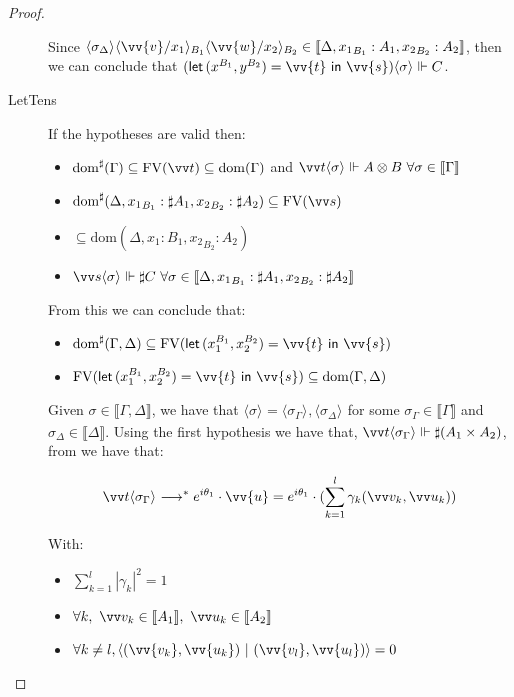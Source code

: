 \documentclass[runningheads,orivec,envcountsame,envcountsect]{llncs}
\newcommand\lra{\longrightarrow}
\newcommand\ansubst[2]{\ensuremath{\langle #1 \rangle_{#2}}}
\newcommand\dom[1]{\mathrm{dom}(#1)}
\newcommand\sdom[1]{\mathrm{dom}^{\sharp}(#1)}
\newcommand\FV[1]{\mathrm{FV}(#1)}
\def\scal#1#2{\langle{#1}~|~{#2}\rangle}
\def\Pair#1#2{(#1,#2)} %
\def\letkeyword{\mathsf{let}}
\def\inkeyword{\mathsf{in}}
\def\LetP#1#2#3#4#5#6{\letkeyword\,\Pair{#1^{#2}}{#3^{#4}}=#5~\inkeyword~#6}
\def\eval{\lra^*}
\def\sem#1{\llbracket#1\rrbracket}
\def\real{\Vdash}
\begin{document}
\begin{proof}
\begin{description}
    Since $\ansubst{\sigma_\Delta}{}\ansubst{\vv{v}/x_1}{B_1}\ansubst{\vv{w}/x_2}{B_2}\in\sem{\Delta,{x_1}_{B_1}:A_1,{x_2}_{B_2}:A_2}$, then we can conclude that $(\LetP{x}{B_1}{y}{B_2}{\vv{t}}{\vv{s}})\ansubst{\sigma}{}\real C$.

    \item[LetTens] If the hypotheses are valid then:
    \begin{itemize}
        \item $\sdom{\Gamma}\subseteq \FV{\vv t} \subseteq \dom{\Gamma}$ and $\vv t \ansubst{\sigma}{}\Vdash A\otimes B\ \forall \sigma\in\sem\Gamma$
        \item $\sdom{\Delta, {x_1}_{B_1}:\sharp A_1, {x_2}_{B_2}:\sharp A_2}\subseteq \FV{\vv s}$
        \item $\subseteq \dom{\Delta,{x_1}:{B_1}, {x_2}_{B_2}:A_2}$
        \item $\vv s \ansubst{\sigma}{}\Vdash \sharp C\ \forall \sigma\in\sem{\Delta, {x_1}_{B_1}:\sharp A_1, {x_2}_{B_2}:\sharp A_2}$
    \end{itemize}
    
    From this we can conclude that:
    \begin{itemize}
        \item $\sdom{\Gamma,\Delta}\subseteq\FV{\LetP{x_1}{B_1}{x_2}{B_2}{\vv{t}}{\vv{s}}}$
        \item $\FV{\LetP{x_1}{B_1}{x_2}{B_2}{\vv{t}}{\vv{s}}}\subseteq\dom{\Gamma,\Delta}$
    \end{itemize}
    
    Given $\sigma\in\sem{\Gamma,\Delta}$, we have that $\ansubst{\sigma}{}=\ansubst{\sigma_\Gamma}{},\ansubst{\sigma_\Delta}{}$ for some $\sigma_\Gamma\in\sem\Gamma$ and $\sigma_\Delta\in\sem\Delta$. Using the first hypothesis we have that, $\vv t\ansubst{\sigma_\Gamma}{}\real \sharp(A_1\times A_2)$, from  we have that:
    
    \[\vv t\ansubst{\sigma_\Gamma}{}\eval e^{i\theta_1}\cdot\vv{u}=e^{i\theta_1}\cdot(\sum_{k=1}^{l} \gamma_k \Pair{\vv v_k}{\vv u_k})\] 
    
    With:
    \begin{itemize}
        \item $\sum_{k=1}^{l} |\gamma_k|^2 = 1$
        \item $\forall k,\ \vv v_k\in\sem{A_1},\ \vv u_k\in\sem{A_2}$
        \item $\forall k\neq l, \scal{\Pair{\vv{v_k}}{\vv{u_k}}}{\Pair{\vv{v_l}}{\vv{u_l}}}= 0$
    \end{itemize}
    

\end{description}
\end{proof}
\end{document}
